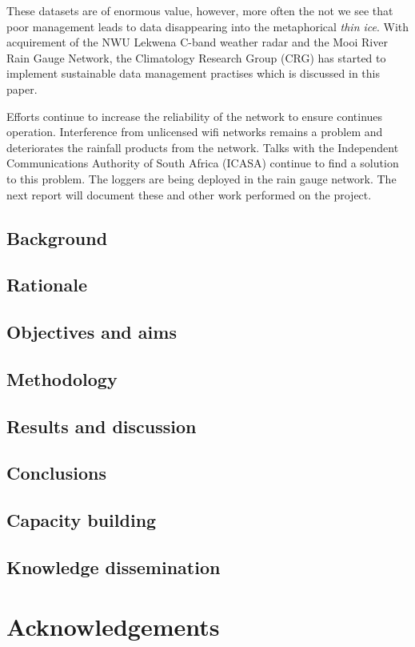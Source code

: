 \documentclass{wrcreport}
\begin{document}
These datasets are of enormous value, however, more often the not we
see that poor management leads to data disappearing into the
metaphorical \textit{thin ice}.  With acquirement of the NWU Lekwena
C-band weather radar and the Mooi River Rain Gauge Network, the
Climatology Research Group (CRG) has started to implement sustainable
data management practises which is discussed in this paper.

Efforts continue to increase the reliability of the network to ensure
continues operation. Interference from unlicensed wifi networks
remains a problem and deteriorates the rainfall products from the
network. Talks with the Independent Communications Authority of South
Africa (ICASA) continue to find a solution to this problem. The
loggers are being deployed in the rain gauge network. The next report
will document these and other work performed on the project.

\section*{Background}
\section*{Rationale}
\section*{Objectives and aims}
\section*{Methodology}
\section*{Results and discussion}
\section*{Conclusions}
\section*{Capacity building}
\section*{Knowledge dissemination}



\pagebreak

\chapter*{Acknowledgements}
\end{document}
